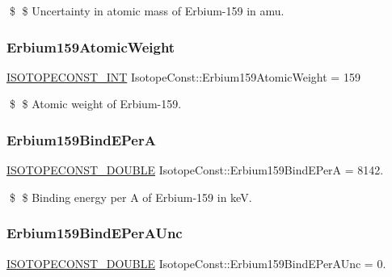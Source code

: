 \$ \$ Uncertainty in atomic mass of Erbium-\/159 in amu. \mbox{\label{group___isotope_const-_erbium-_er159_ga996d33727f427494376e68477ad9141d}} 
\subsubsection{\texorpdfstring{Erbium159\+Atomic\+Weight}{Erbium159AtomicWeight}}
{\footnotesize\ttfamily \mbox{\hyperlink{group___isotope_const-_macros_ga5f18360b3e99483a35c32d789e62621c}{I\+S\+O\+T\+O\+P\+E\+C\+O\+N\+S\+T\+\_\+\+I\+NT}} Isotope\+Const\+::\+Erbium159\+Atomic\+Weight = 159}

\$ \$ Atomic weight of Erbium-\/159. \mbox{\label{group___isotope_const-_erbium-_er159_ga85a2a13bac5bc88018b1b46ef391cc6e}} 
\subsubsection{\texorpdfstring{Erbium159\+Bind\+E\+PerA}{Erbium159BindEPerA}}
{\footnotesize\ttfamily \mbox{\hyperlink{group___isotope_const-_macros_ga8f45a7272ce02c0b4c65c44636ed719a}{I\+S\+O\+T\+O\+P\+E\+C\+O\+N\+S\+T\+\_\+\+D\+O\+U\+B\+LE}} Isotope\+Const\+::\+Erbium159\+Bind\+E\+PerA = 8142.}

\$ \$ Binding energy per A of Erbium-\/159 in keV. \mbox{\label{group___isotope_const-_erbium-_er159_ga055dc642e0ca6c4e529f4b2fbc149b08}} 
\subsubsection{\texorpdfstring{Erbium159\+Bind\+E\+Per\+A\+Unc}{Erbium159BindEPerAUnc}}
{\footnotesize\ttfamily \mbox{\hyperlink{group___isotope_const-_macros_ga8f45a7272ce02c0b4c65c44636ed719a}{I\+S\+O\+T\+O\+P\+E\+C\+O\+N\+S\+T\+\_\+\+D\+O\+U\+B\+LE}} Isotope\+Const\+::\+Erbium159\+Bind\+E\+Per\+A\+Unc = 0.}

